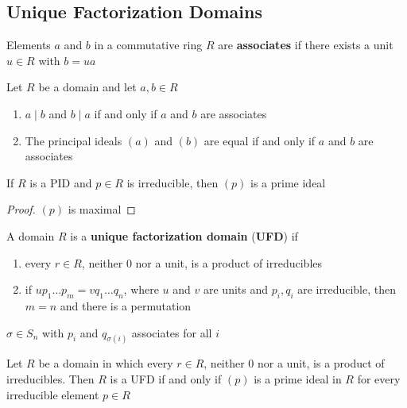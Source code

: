 \documentclass[11pt]{article}
\begin{document}
\subsection{Unique Factorization Domains}
\label{sec:org65f4b01}
\begin{definition}[]
Elements \(a\) and \(b\) in a commutative ring \(R\) are \textbf{associates} if there exists
a unit \(u\in R\) with \(b=ua\)
\end{definition}

\begin{proposition}[]
Let \(R\) be a domain and let \(a,b\in R\)
\begin{enumerate}
\item \(a\mid b\) and \(b\mid a\) if and only if \(a\) and \(b\) are associates
\item The principal ideals \((a)\)  and \((b)\) are equal if and only if \(a\)
and \(b\) are associates
\end{enumerate}
\end{proposition}

\begin{corollary}[]
If \(R\) is a PID and \(p\in R\) is irreducible, then \((p)\) is a prime ideal
\end{corollary}

\begin{proof}
\((p)\) is maximal
\end{proof}

\begin{definition}[]
A domain \(R\) is a \textbf{unique factorization domain} (\textbf{UFD}) if
\begin{enumerate}
\item every \(r\in R\), neither 0 nor a unit, is a product of irreducibles
\item if \(up_1\dots p_m=vq_1\dots q_n\), where \(u\) and \(v\) are units and
\(p_i,q_i\) are irreducible, then \(m=n\) and there is a permutation
\end{enumerate}
\(\sigma\in S_n\) with \(p_i\) and \(q_{\sigma(i)}\) associates for all \(i\)
\end{definition}

\begin{proposition}[]
\label{prop6.17}
Let \(R\) be a domain in which every \(r\in R\), neither 0 nor a unit, is a
product of irreducibles. Then \(R\) is a UFD if and only if \((p)\) is a prime
ideal in \(R\) for every irreducible element \(p\in R\)
\end{proposition}
\end{document}

